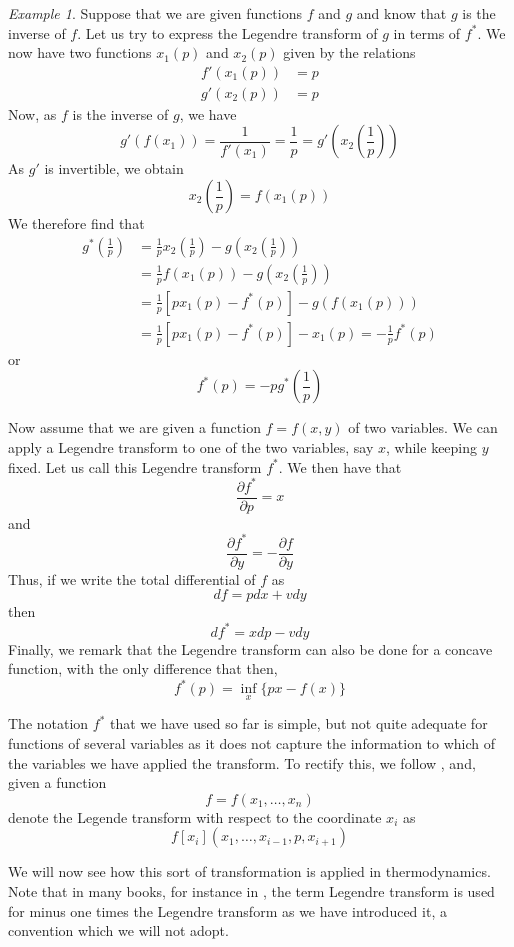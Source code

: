 \documentclass[a4paper, draft]{report}
\numberwithin{section}{chapter}
\numberwithin{equation}{chapter}
\theoremstyle{own}
\theoremstyle{remark}
\newtheorem{example}{Example}[section]
\begin{document}
\begin{example}
Suppose that we are given functions $f$ and $g$ and know that $g$ is the inverse of $f$. Let us try to express the Legendre transform of $g$ in terms of $f^*$. We now have two functions $x_1(p)$ and $x_2(p)$ given by the relations
\begin{align*}
f'(x_1(p)) &= p \\
g'(x_2(p)) &= p
\end{align*}
Now, as $f$ is the inverse of $g$, we have
$$
g'(f(x_1)) = \frac{1}{f'(x_1)} = \frac{1}{p} = g'(x_2(\frac{1}{p}))
$$
As $g'$ is invertible, we obtain
$$
x_2(\frac{1}{p}) = f(x_1(p))
$$
We therefore find that
\begin{align*}
g^*(\frac{1}{p}) &= \frac{1}{p} x_2(\frac{1}{p}) - g(x_2(\frac{1}{p})) \\
&= \frac{1}{p} f(x_1(p)) - g(x_2(\frac{1}{p})) \\
&= \frac{1}{p}  [ p x_1(p) - f^*(p)  ] - g(f(x_1(p))) \\
&= \frac{1}{p}  [ p x_1(p) - f^*(p)  ] - x_1(p) = - \frac{1}{p} f^*(p)
\end{align*}
or
$$
f^*(p) = - p g^*(\frac{1}{p})
$$
\end{example}

Now assume that we are given a function $f = f(x,y)$ of two variables. We can apply a Legendre transform to one of the two variables, say $x$, while keeping $y$ fixed. Let us call this Legendre transform $f^*$. We then have that
$$
\frac{\partial f^*}{\partial p} = x
$$
and
$$
\frac{\partial f^*}{\partial y} = - \frac{\partial f}{\partial y}
$$
Thus, if we write the total differential of $f$ as
$$
df = p dx + v dy
$$
then
$$
df^* = x dp - v dy
$$
Finally, we remark that the Legendre transform can also be done for a concave function, with the only difference that then,
$$
f^*(p) = \inf_{x} \{ px - f(x)\}
$$

The notation $f^*$ that we have used so far is simple, but not quite adequate for functions of several variables as it does not capture the information to which of the variables we have applied the transform. To rectify this, we follow \cite{Callen}, and, given a function
$$
f = f(x_1, \dots, x_n)
$$
denote the Legende transform with respect to the coordinate $x_i$ as
$$
f[x_i](x_1, \dots, x_{i-1}, p, x_{i+1})
$$


We will now see how this sort of transformation is applied in thermodynamics. Note that in many books, for instance in \cite{Callen}, the term Legendre transform is used for minus one times the Legendre transform as we have introduced it, a convention which we will not adopt.
\end{document}
